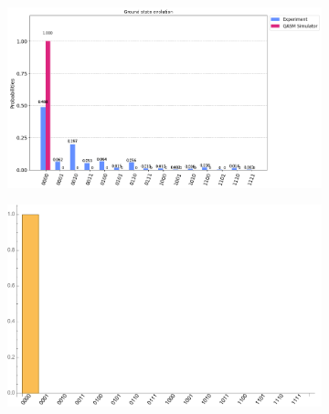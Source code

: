 \documentclass[10pt]{amsart}
\theoremstyle{definition}
\begin{document}
\begin{figure}[hbt]
  \begin{subfigure}{0.4\textwidth}
    \centering
    \includegraphics[width=0.9\linewidth]{smallt_input0_quantum.png}
  \end{subfigure}
  \begin{subfigure}{0.4\textwidth}
    \centering
    \includegraphics[width=0.9\linewidth]{smallt_input0_exact.pdf}
  \end{subfigure}
  

\end{figure}
\end{document}
